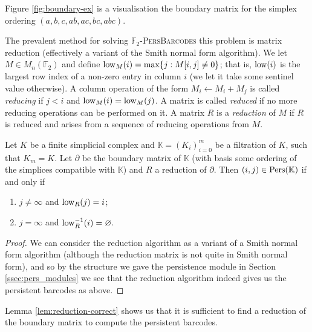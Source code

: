 \begin{example}
  Figure \ref{fig:boundary-ex} is a visualisation the boundary matrix for the simplex ordering $(a, b, c, ab, ac, bc, abc)$.
\end{example}

The prevalent method for solving \textsc{$\mathbb F_2$-PersBarcodes} this problem is matrix reduction (effectively a variant of the Smith normal form algorithm). We let $M \in M_n(\mathbb F_2)$ and define $\operatorname{low}_M(i) = \max\{j: M[i, j] \neq 0\}$; that is, $\operatorname{low}(i)$ is the largest row index of a non-zero entry in column $i$ (we let it take some sentinel value otherwise). A column operation of the form $M_i \gets M_i + M_j$ is called \emph{reducing} if $j < i$ and $\operatorname{low}_M(i) = \operatorname{low}_M(j)$. A matrix is called \emph{reduced} if no more reducing operations can be performed on it. A matrix $R$ is a \emph{reduction} of $M$ if $R$ is reduced and arises from a sequence of reducing operations from $M$.

\begin{lemma}
  \label{lem:reduction-correct}
  Let $K$ be a finite simplicial complex and $\mathbb K = (K_i)_{i=0}^m$ be a filtration of $K$, such that $K_m = K$. Let $\partial$ be the boundary matrix of $\mathbb K$ (with basis some ordering of the simplices compatible with $\mathbb K$) and $R$ a reduction of $\partial$. Then $(i, j) \in \operatorname{Pers}(\mathbb K)$ if and only if
  \begin{enumerate}
    \item $j \neq \infty$ and $\operatorname{low}_R(j) = i$;
    \item $j = \infty$ and $\operatorname{low}^{-1}_R(i) = \varnothing$. 
  \end{enumerate}
\end{lemma}

\begin{proof}
  We can consider the reduction algorithm as a variant of a Smith normal form algorithm (although the reduction matrix is not quite in Smith normal form), and so by the structure we gave the persistence module in Section \ref{ssec:pers_modules} we see that the reduction algorithm indeed gives us the persistent barcodes as above.
\end{proof}

Lemma \ref{lem:reduction-correct} shows us that it is sufficient to find a reduction of the boundary matrix to compute the persistent barcodes. 

